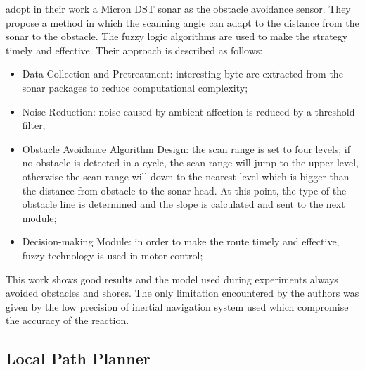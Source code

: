 \documentclass[12pt]{article}
\begin{document}
              \textcite{Conference2013} adopt in their work a Micron DST sonar as the obstacle avoidance sensor. They propose a method in which the scanning angle can adapt to the distance from the sonar to the obstacle. The fuzzy logic algorithms are used to make the strategy timely and effective. Their approach is described as follows:
                    \begin{itemize}
                          \item Data Collection and Pretreatment: interesting byte are extracted from the sonar packages to reduce computational complexity;
                          \item Noise Reduction: noise caused by ambient affection is reduced by a threshold filter;
                          \item Obstacle Avoidance Algorithm Design: the scan range is set to four levels; if no obstacle is detected in a cycle, the scan range will jump to the upper level, otherwise the scan range will down to the nearest level which is bigger than the distance from obstacle to the sonar head. At this point, the type of the obstacle line is determined and the slope is calculated and sent to the next module;
                          \item Decision-making Module: in order to make the route timely and effective, fuzzy technology is used in motor control;
                    \end{itemize}
              This work shows good results and the model used during experiments always avoided obstacles and shores. The only limitation encountered by the authors was given by the low precision of inertial navigation system used which compromise the accuracy of the reaction.



        \subsection{Local Path Planner} \label{lpp}
\end{document}
